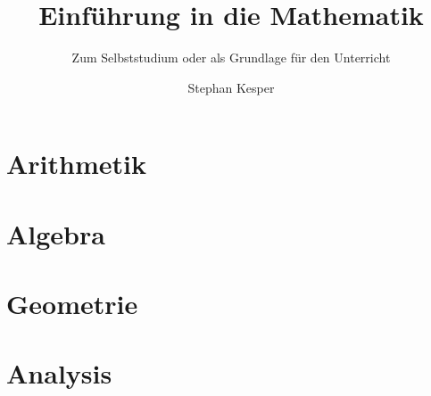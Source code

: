\documentclass[graybox,envcountchap,sectrefs,deutsch]{svmono}
\author{Stephan Kesper}
\title{Einführung in die Mathematik}
\subtitle{Zum Selbststudium oder als Grundlage für den Unterricht}
\begin{document}
\maketitle

\frontmatter



\tableofcontents

\mainmatter

\part{Arithmetik}



\part{Algebra}



\part{Geometrie}



\part{Analysis}

\backmatter
\end{document}
